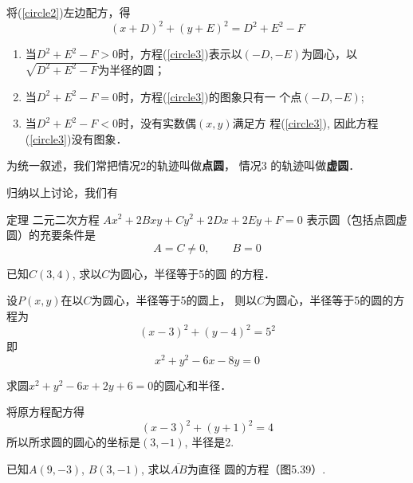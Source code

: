 将(\ref{circle2})左边配方，得
\begin{equation}\label{circle3}
    (x+D)^2+(y+E)^2=D^2+E^2-F
\end{equation}

\begin{enumerate}
\item 当$D^2+E^2-F>0$时，方程(\ref{circle3})表示以$(-D,
-E)$为圆心，以$\sqrt{D^2+E^2-F}$为半径的圆；
\item 当$D^2+E^2-F=0$时，方程(\ref{circle3})的图象只有一
个点$(-D,-E)$;
\item 当$D^2+E^2-F<0$时，没有实数偶$(x,y)$满足方
程(\ref{circle3}), 因此方程(\ref{circle3})没有图象．
\end{enumerate}

为统一叙述，我们常把情况2的轨迹叫做\textbf{点圆}，
情况3
的轨迹叫做\textbf{虚圆}．

归纳以上讨论，我们有

\begin{blk}
   {定理} 二元二次方程
$Ax^2+2Bxy+Cy^2+2Dx+2Ey+F=0$
表示圆（包括点圆虚圆）的充要条件是
\[A=C\ne 0,\qquad B=0\] 
\end{blk}

\begin{example}
    已知$C(3,4)$, 求以$C$为圆心，半径等于5的圆
的方程．
\end{example}

\begin{solution}
设$P(x,y)$在以$C$为圆心，半径等于5的圆上，
则以$C$为圆心，半径等于5的圆的方程为
\[(x-3)^2+(y-4)^2=5^2\]
即
\[x^2+y^2-6x-8y=0\]
\end{solution}

\begin{example}
    求圆$x^2+y^2-6x+2y+6=0$的圆心和半径．
\end{example}

\begin{solution}
    将原方程配方得
\[(x-3)^2+(y+1)^2=4\]
所以所求圆的圆心的坐标是$(3,-1)$, 半径是2.
\end{solution}

\begin{example}
    已知$A(9,-3)$, $B(3,-1)$, 求以$\overline{AB}$为直径
圆的方程（图5.39）.
\end{example}

\begin{figure}[htp]
    \centering
{}   
    \caption{}
\end{figure}


